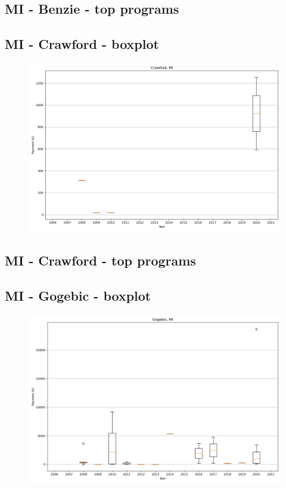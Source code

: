 \subsection*{MI - Benzie - top programs}

\newpage
\subsection*{MI - Crawford - boxplot}
\begin{figure}[h]
\centering
\includegraphics[width=7in]{../output/boxplots/counties/Crawford-MI_boxplot.png}
\end{figure}


\subsection*{MI - Crawford - top programs}

\newpage
\subsection*{MI - Gogebic - boxplot}
\begin{figure}[h]
\centering
\includegraphics[width=7in]{../output/boxplots/counties/Gogebic-MI_boxplot.png}
\end{figure}


